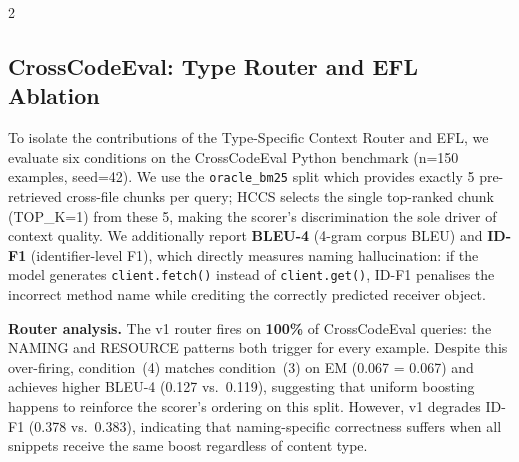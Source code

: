 \documentclass[11pt,a4paper]{article}
\begin{document}
\begin{multicols}{2}
\subsection{CrossCodeEval: Type Router and EFL Ablation}

To isolate the contributions of the Type-Specific Context Router and EFL, we evaluate six conditions on the CrossCodeEval Python benchmark \citep{ding2023crosscodeeval} (n=150 examples, seed=42). We use the \texttt{oracle\_bm25} split which provides exactly 5 pre-retrieved cross-file chunks per query; HCCS selects the single top-ranked chunk (TOP\_K=1) from these 5, making the scorer's discrimination the sole driver of context quality. We additionally report \textbf{BLEU-4} (4-gram corpus BLEU) and \textbf{ID-F1} (identifier-level F1), which directly measures naming hallucination: if the model generates \texttt{client.fetch()} instead of \texttt{client.get()}, ID-F1 penalises the incorrect method name while crediting the correctly predicted receiver object.

\begin{center}
\label{tab:cceval}
\end{center}

\noindent\textbf{Router analysis.} The v1 router fires on \textbf{100\%} of CrossCodeEval queries: the NAMING and RESOURCE patterns both trigger for every example. Despite this over-firing, condition~(4) matches condition~(3) on EM (0.067 = 0.067) and achieves higher BLEU-4 (0.127 vs.\ 0.119), suggesting that uniform boosting happens to reinforce the scorer's ordering on this split. However, v1 degrades ID-F1 (0.378 vs.\ 0.383), indicating that naming-specific correctness suffers when all snippets receive the same boost regardless of content type.


\end{multicols}
\end{document}
